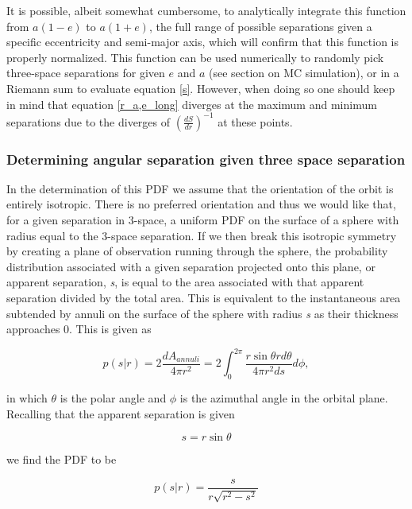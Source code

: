 \documentclass{article}
\begin{document}
	It is possible, albeit somewhat cumbersome, to analytically integrate this function from $a(1-e)$ to $a(1+e)$, the full range of possible separations given a specific eccentricity and semi-major axis, which will confirm that this function is properly normalized. 
	This function can be used numerically to randomly pick three-space separations for given $e$ and $a$ (see section on MC simulation), or in a Riemann sum to evaluate equation \eqref{s}. However, when doing so one should keep in mind that equation \eqref{r_a,e_long} diverges at the maximum and minimum separations due to the diverges of $\left(\frac{dS}{dr}\right)^{-1}$ at these points. 

	
	\subsubsection{Determining angular separation given three space separation}
	In the determination of this PDF we assume that the orientation of the orbit is entirely isotropic. There is no preferred orientation and thus we would like that, for a given separation in 3-space, a uniform PDF on the surface of a sphere with radius equal to the 3-space separation. If we then break this isotropic symmetry by creating a plane of observation running through the sphere, the probability distribution associated with a given separation projected onto this plane, or apparent separation, \textit{s}, is equal to the area associated with that apparent separation divided by the total area. This is equivalent to the instantaneous area subtended by annuli on the surface of the sphere with radius \textit{s} as their thickness approaches 0. This is given as
	
	\begin{equation} \label{p(s|r)_equ}
	p(s|r) = 2 \frac{dA_{annuli}}{4 \pi r^2} = 2 \int^{2 \pi}_{0} \frac{r \sin{\theta} r d\theta}{4 \pi r^2 ds} d\phi,
	\end{equation}
	
in which $\theta$ is the polar angle and $\phi$ is the azimuthal angle in the orbital plane. Recalling that the apparent separation is given
	
	\begin{equation} \label{rsin}
	s = r \sin{\theta}
	\end{equation}
	
we find the PDF to be
	
	\begin{equation} \label{p(s|r)_full}
	p(s|r) = \frac{s}{r\sqrt{r^2 - s^2}}
	\end{equation}
	
\end{document}
